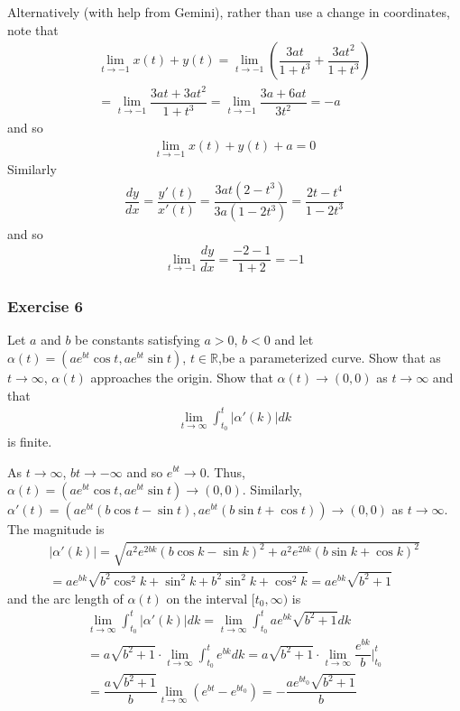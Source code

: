 \documentclass{article}
\newcommand{\R}{\mathbb{R}}
\begin{document}
	Alternatively (with help from Gemini), rather than use a change in coordinates, note that
	\begin{gather*}
		\lim_{t \to -1} x(t) + y(t) = \lim_{t \to -1} \left( \dfrac{3at}{1 + t^3} + \dfrac{3at^2}{1 + t^3} \right) \\ 
		= \lim_{t \to -1} \dfrac{3at + 3at^2}{1 + t^3} = \lim_{t \to -1} \dfrac{3a + 6at}{3t^2} = -a
	\end{gather*}
	and so 
	\begin{gather*}
		\lim_{t \to -1} x(t) + y(t) + a = 0
	\end{gather*}
	Similarly
	\begin{gather*}
		\dfrac{dy}{dx} = \dfrac{y'(t)}{x'(t)} = \dfrac{3at(2 - t^3)}{3a(1 - 2t^3)} = \dfrac{2t - t^4}{1 - 2t^3}
	\end{gather*}
	and so
	\begin{gather*}
		\lim_{t \to -1} \dfrac{dy}{dx} = \dfrac{-2-1}{1+2} = -1
	\end{gather*}	
	
	\subsubsection*{Exercise 6}
	Let $a$ and $b$ be constants satisfying $a > 0$, $b < 0$ and let $\alpha(t) = (ae^{bt} \cos t, ae^{bt} \sin t)$, $t \in \R$,be a parameterized curve. Show that as $t \to \infty$, $\alpha(t)$ approaches the origin. Show that $\alpha(t) \to (0, 0)$ as $t \to \infty$ and that
	\begin{gather*}
		\lim_{t \to \infty} \int_{t_0}^t \left| \alpha'(k) \right| dk
	\end{gather*}
	is finite.
	
	As $t \to \infty$, $bt \to -\infty$ and so $e^{bt} \to 0$. Thus, $\alpha(t) = (ae^{bt} \cos t, ae^{bt} \sin t) \to (0, 0)$. Similarly, $\alpha'(t) = \left( ae^{bt} (b\cos t - \sin t), ae^{bt} (b \sin t + \cos t) \right) \to (0, 0)$ as $t \to \infty$. The magnitude is
	\begin{gather*}
		\left| \alpha'(k) \right| = \sqrt{a^2e^{2bk} (b\cos k - \sin k)^2 + a^2e^{2bk} (b\sin k + \cos k)^2} \\
		= ae^{bk} \sqrt{b^2 \cos^2 k + \sin^2 k + b^2 \sin^2 k + \cos^2 k} = ae^{bk} \sqrt{b^2 + 1}
	\end{gather*}
	and the arc length of $\alpha(t)$ on the interval $[t_0, \infty)$ is
	\begin{gather*}
		\lim_{t \to \infty} \int_{t_0}^t \left| \alpha'(k) \right| dk = \lim_{t \to \infty} \int_{t_0}^t ae^{bk} \sqrt{b^2 + 1} dk \\
		= a \sqrt{b^2 + 1} \cdot \lim_{t \to \infty} \int_{t_0}^t e^{bk} dk = a \sqrt{b^2 + 1} \cdot \lim_{t \to \infty} \dfrac{e^{bk}}{b} \Biggr|_{t_0}^t \\ 
		= \dfrac{a \sqrt{b^2 + 1}}{b} \lim_{t \to \infty} ( e^{bt} - e^{bt_0} ) = - \dfrac{a e^{bt_0} \sqrt{b^2 + 1}}{b}
	\end{gather*}
	
\end{document}
